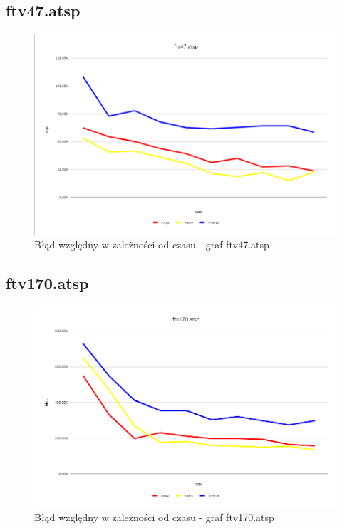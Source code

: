 \documentclass{article}
\begin{document}
\subsection{ftv47.atsp}
\begin{figure}[h!]
\centering
\includegraphics[width=\textwidth]{img/47.png}
\caption{Błąd względny w zależności od czasu - graf ftv47.atsp}
\end{figure}
\newpage
\subsection{ftv170.atsp}
\begin{figure}[h!]
\centering
\includegraphics[width=\textwidth]{img/170.png}
\caption{Błąd względny w zależności od czasu - graf ftv170.atsp}
\end{figure}
\newpage
\end{document}
